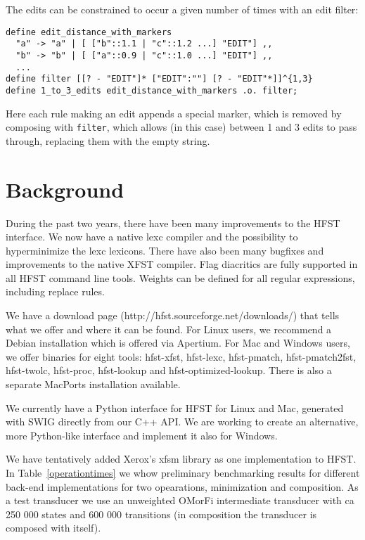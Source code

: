 \documentclass{llncs}
\begin{document}
The edits can be constrained to occur a given number of times with an edit
filter:

\begin{framed}
\begin{verbatim}
define edit_distance_with_markers
  "a" -> "a" | [ ["b"::1.1 | "c"::1.2 ...] "EDIT"] ,,
  "b" -> "b" | [ ["a"::0.9 | "c"::1.0 ...] "EDIT"] ,,
  ...
define filter [[? - "EDIT"]* ["EDIT":""] [? - "EDIT"*]]^{1,3}
define 1_to_3_edits edit_distance_with_markers .o. filter;
\end{verbatim}
\end{framed}

Here each rule making an edit appends a special marker, which is removed
by composing with \verb+filter+, which allows (in this case) between 1 and 3
edits to pass through, replacing them with the empty string.

\section{Background}\label{sec:background}
During the past two years, there have been many improvements to the HFST 
interface. We now have a native lexc compiler and the possibility to 
hyperminimize the lexc lexicons. There have also been many bugfixes and 
improvements to the native XFST compiler. Flag diacritics are fully supported 
in all HFST command line tools. Weights can be defined for all regular expressions,
including replace rules.

We have a download page (http://hfst.sourceforge.net/downloads/) that tells what 
we offer and where it can be found. For Linux users, we recommend a Debian installation
which is offered via Apertium. For Mac and Windows users,
we offer binaries for eight tools: hfst-xfst, hfst-lexc, hfst-pmatch,
hfst-pmatch2fst, hfst-twolc, hfst-proc, hfst-lookup and hfst-optimized-lookup.
There is also a separate MacPorts installation available.

We currently have a Python interface for HFST for Linux and Mac, generated with SWIG directly
from our C++ API. We are working to create an alternative, more Python-like interface
and implement it also for Windows.

We have tentatively added Xerox's xfsm library as one implementation to HFST.
In Table~\ref{operationtimes} we whow preliminary benchmarking results for different back-end
implementations for two opearations, minimization and composition. As a test transducer we use an 
unweighted OMorFi intermediate transducer with ca 250 000 states and 600 000 transitions (in composition
the transducer is composed with itself).
\end{document}
